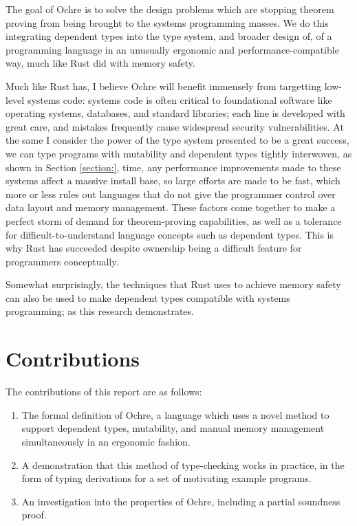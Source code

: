 \documentclass[12pt,twoside]{report}
\begin{document}
The goal of Ochre is to solve the design problems which are stopping theorem proving from being brought to the systems programming masses. We do this integrating dependent types into the type system, and broader design of, of a programming language in an unusually ergonomic and performance-compatible way, much like Rust did with memory safety.

Much like Rust has, I believe Ochre will benefit immensely from targetting low-level systems code: systems code is often critical to foundational software like operating systems, databases, and standard libraries; each line is developed with great care, and mistakes frequently cause widespread security vulnerabilities. At the same I consider the power of the type system presented to be a great success, we can type programs with mutability and dependent types tightly interwoven, as shown in Section \ref{section:}, time, any performance improvements made to these systems affect a massive install base, so large efforts are made to be fast, which more or less rules out languages that do not give the programmer control over data layout and memory management. These factors come together to make a perfect storm of demand for theorem-proving capabilities, as well as a tolerance for difficult-to-understand language concepts such as dependent types. This is why Rust has succeeded despite ownership being a difficult feature for programmers conceptually.

Somewhat surprisingly, the techniques that Rust uses to achieve memory safety can also be used to make dependent types compatible with systems programming; as this research demonstrates.

\section{Contributions}
The contributions of this report are as follows:
\begin{enumerate}
  \itemsep0em
  \item The formal definition of Ochre, a language which uses a novel method to support dependent types, mutability, and manual memory management simultaneously in an ergonomic fashion.
  \item A demonstration that this method of type-checking works in practice, in the form of typing derivations for a set of motivating example programs.
  \item An investigation into the properties of Ochre, including a partial soundness proof.
\end{enumerate}
\end{document}
